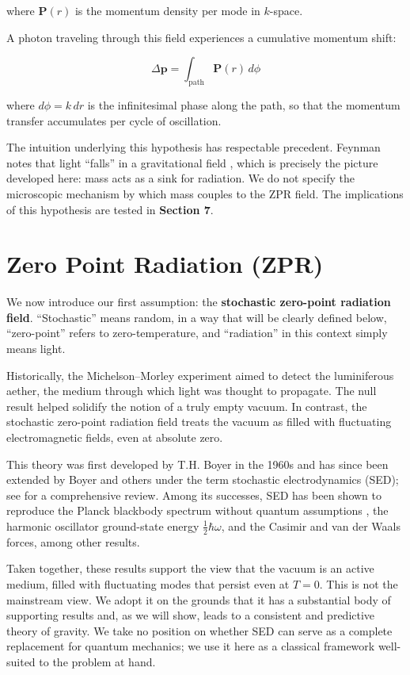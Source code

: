\documentclass {article}
\renewcommand\vec{\mathbf}
\begin{document}
where $\vec{P}(r)$ is the momentum density per mode in $k$-space.

A photon traveling through this field experiences a cumulative momentum shift:

\begin{equation}
\Delta \vec{p} = \int_{\text{path}} \vec{P}(r) \, d\phi
\label{eq:hypothesis2}
\end{equation}

\noindent where \(d\phi= k\, dr\) is the infinitesimal phase along the path, so that the momentum transfer accumulates per cycle of oscillation.


The intuition underlying this hypothesis has respectable precedent. Feynman notes that light ``falls'' in a gravitational field \cite{feynman_gravity}, which is precisely the picture developed here: mass acts as a sink for radiation. We do not specify the microscopic mechanism by which mass couples to the ZPR field. The implications of this hypothesis are tested in \textbf{Section 7}.


\section{Zero Point Radiation (ZPR)}

We now introduce our first assumption: the \textbf{stochastic zero-point radiation field}. ``Stochastic'' means random, in a way that will be clearly defined below, ``zero-point'' refers to zero-temperature, and ``radiation'' in this context simply means light.

Historically, the Michelson--Morley experiment aimed to detect the luminiferous aether, the medium through which light was thought to propagate. The null result helped solidify the notion of a truly empty vacuum. In contrast, the stochastic zero-point radiation field treats the vacuum as filled with fluctuating electromagnetic fields, even at absolute zero.

This theory was first developed by T.H. Boyer in the 1960s and has since been extended by Boyer and others under the term stochastic electrodynamics (SED); see \cite{boyer2019} for a comprehensive review. Among its successes, SED has been shown to reproduce the Planck blackbody spectrum without quantum assumptions \cite{boyer1969}, the harmonic oscillator ground-state energy $\tfrac{1}{2}\hbar\omega$, and the Casimir and van der Waals forces, among other results.

Taken together, these results support the view that the vacuum is an active medium, filled with fluctuating modes that persist even at $T = 0$. This is not the mainstream view. We adopt it on the grounds that it has a substantial body of supporting results and, as we will show, leads to a consistent and predictive theory of gravity. We take no position on whether SED can serve as a complete replacement for quantum mechanics; we use it here as a classical framework well-suited to the problem at hand.
\end{document}
